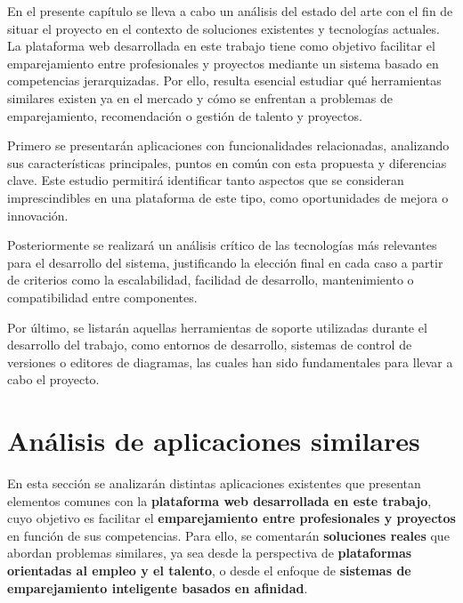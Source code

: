 
En el presente capítulo se lleva a cabo un análisis del estado del arte con el fin de situar el 
proyecto en el contexto de soluciones existentes y tecnologías actuales. La plataforma 
web desarrollada en este trabajo tiene como objetivo facilitar el emparejamiento entre 
profesionales y proyectos mediante un sistema basado en competencias jerarquizadas. 
Por ello, resulta esencial estudiar qué herramientas similares existen ya en el mercado 
y cómo se enfrentan a problemas de emparejamiento, recomendación o gestión de 
talento y proyectos.

Primero se presentarán aplicaciones con funcionalidades relacionadas, analizando sus 
características principales, puntos en común con esta propuesta y diferencias clave. 
Este estudio permitirá identificar tanto aspectos que se consideran imprescindibles en 
una plataforma de este tipo, como oportunidades de mejora o innovación.

Posteriormente se realizará un análisis crítico de las tecnologías más relevantes para el 
desarrollo del sistema, justificando la elección final en cada caso a partir de criterios 
como la escalabilidad, facilidad de desarrollo, mantenimiento o compatibilidad entre 
componentes.

Por último, se listarán aquellas herramientas de soporte utilizadas durante el desarrollo 
del trabajo, como entornos de desarrollo, sistemas de control de versiones o editores 
de diagramas, las cuales han sido fundamentales para llevar a cabo el proyecto.


\section{Análisis de aplicaciones similares}
En esta sección se analizarán distintas aplicaciones existentes que presentan elementos 
comunes con la \textbf{plataforma web desarrollada en este trabajo}, cuyo objetivo es 
facilitar el \textbf{emparejamiento entre profesionales y proyectos} en función de sus 
competencias. Para ello, se comentarán \textbf{soluciones reales} que abordan problemas 
similares, ya sea desde la perspectiva de \textbf{plataformas orientadas al empleo y el talento}, 
o desde el enfoque de \textbf{sistemas de emparejamiento inteligente basados en afinidad}.

